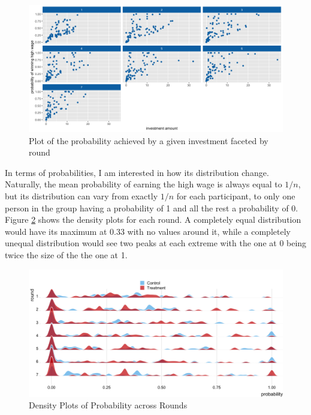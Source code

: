 \begin{figure}
    \centering
    \includegraphics[width=\textwidth]{graphs/invest_prob_point.png}
    \caption{Plot of the probability achieved by a given investment faceted by round}
    \label{fig:invest_prob_point}
\end{figure}

In terms of probabilities, I am interested in how its distribution change. Naturally, the mean probability of earning the high wage is always equal to $1/n$, but its distribution can vary from exactly $1/n$ for each participant, to only one person in the group having a probability of 1 and all the rest a probability of 0. Figure \ref{fig:dens_prob} shows the density plots for each round. A completely equal distribution would have its maximum at 0.33 with no values around it, while a completely unequal distribution would see two peaks at each extreme with the one at 0 being twice the size of the the one at 1.\\

\begin{figure}[H]
    \centering
    \includegraphics[width = \textwidth]{graphs/density_ridge_prob.png}
    \caption{Density Plots of Probability across Rounds}
    \label{fig:dens_prob}
\end{figure}

